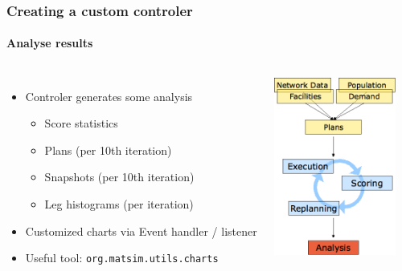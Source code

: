 \begin{frame}[fragile]
\frametitle{Creating a custom controler}
\framesubtitle{Analyse results}
\begin{columns}[T]

\column{7cm}

\begin{itemize}
  \item Controler generates some analysis
  \begin{itemize}
    \item Score statistics
    \item Plans (per 10th iteration)
    \item Snapshots (per 10th iteration)
  	\item Leg histograms (per iteration)
  \end{itemize}
  \item Customized charts via Event handler / listener
  \item Useful tool: \verb|org.matsim.utils.charts|
\end{itemize}

\column{5cm}
\includegraphics[width=4cm]{../graphics/overviewMatsimAnalysis.png}

\end{columns}
\end{frame}
